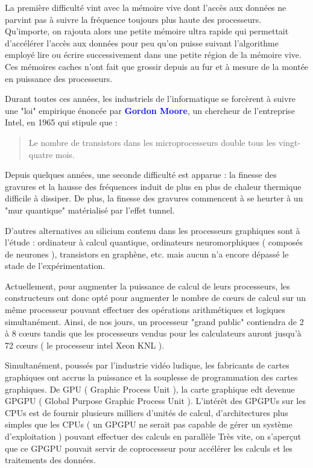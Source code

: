 \documentclass[fleqn,11pt]{article}
\begin{document}
La première difficulté vint avec la mémoire vive dont l'accès aux données ne parvint pas à suivre la fréquence toujours plus haute des processeurs. Qu'importe, on rajouta alors une petite mémoire ultra rapide qui permettait d'accélérer l'accès aux données pour peu qu'on puisse suivant l'algorithme employé lire ou écrire successivement dans une petite région de la mémoire vive. Ces mémoires caches n'ont fait que grossir depuis au fur et à mesure de la montée en puissance des processeurs. 

Durant toutes ces années, les industriels de l'informatique se forcèrent à suivre une "loi" empirique énoncée par \textbf{\textcolor{blue}{Gordon Moore}}, un chercheur de l'entreprise Intel, en 1965 qui  stipule que :
\begin{quote}
Le nombre de transistors dans les microprocesseurs double tous les vingt-quatre mois.
\end{quote}

Depuis quelques années, une seconde difficulté est apparue : la finesse des gravures et la hausse des fréquences induit de plus en plus de chaleur thermique difficile à dissiper. De plus, la finesse des gravures commencent à se heurter à un "mur quantique" matérialisé par l'effet tunnel.

D'autres alternatives au silicium contenu dans les processeurs graphiques sont à l'étude : ordinateur à calcul quantique, ordinateurs neuromorphiques ( composés de neurones ), transistors en graphène, etc. mais aucun n'a encore dépassé le stade de l'expérimentation. 

Actuellement, pour augmenter la puissance de calcul de leurs processeurs, les constructeurs ont donc opté pour augmenter le nombre de c{\oe}urs de calcul sur un même processeur pouvant effectuer des opérations arithmétiques et logiques simultanément. Ainsi,  de nos jours, un processeur "grand public" contiendra de 2 à 8 c{\oe}urs tandis que les processeurs vendus pour les calculateurs auront jusqu'à 72 c{\oe}urs ( le processeur intel Xeon KNL ).

Simultanément, poussés par l'industrie vidéo ludique, les fabricants de cartes graphiques ont accrus la puissance et la souplesse de programmation des cartes graphiques. De GPU ( Graphic Process Unit ), la carte graphique edt devenue GPGPU ( Global Purpose Graphic Process Unit ). L'intérêt des GPGPUs sur les CPUs est de fournir plusieurs milliers d'unités de calcul, d'architectures plus simples que les CPUs ( un GPGPU ne serait pas capable de gérer un système d'exploitation ) pouvant effectuer des calculs en parallèle 
Très vite, on s'aperçut que ce GPGPU pouvait servir de coprocesseur pour accélérer les calculs et les traitements des données. 
\end{document}
